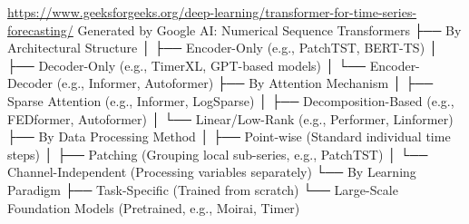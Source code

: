 \url{https://www.geeksforgeeks.org/deep-learning/transformer-for-time-series-forecasting/}
Generated by Google AI:
Numerical Sequence Transformers
├── By Architectural Structure
│ ├── Encoder-Only (e.g., PatchTST, BERT-TS)
│ ├── Decoder-Only (e.g., TimerXL, GPT-based models)
│ └── Encoder-Decoder (e.g., Informer, Autoformer)
├── By Attention Mechanism
│ ├── Sparse Attention (e.g., Informer, LogSparse)
│ ├── Decomposition-Based (e.g., FEDformer, Autoformer)
│ └── Linear/Low-Rank (e.g., Performer, Linformer)
├── By Data Processing Method
│ ├── Point-wise (Standard individual time steps)
│ ├── Patching (Grouping local sub-series, e.g., PatchTST)
│ └── Channel-Independent (Processing variables separately)
└── By Learning Paradigm
├── Task-Specific (Trained from scratch)
└── Large-Scale Foundation Models (Pretrained, e.g., Moirai, Timer)